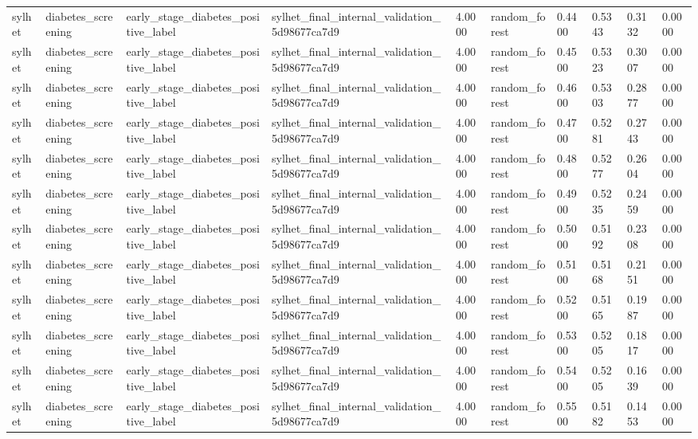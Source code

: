 \begin{tabular}{llllllllll}
sylhet & diabetes\_screening & early\_stage\_diabetes\_positive\_label & sylhet\_final\_internal\_validation\_5d98677ca7d9 & 4.0000 & random\_forest & 0.4400 & 0.5343 & 0.3132 & 0.0000 \\
sylhet & diabetes\_screening & early\_stage\_diabetes\_positive\_label & sylhet\_final\_internal\_validation\_5d98677ca7d9 & 4.0000 & random\_forest & 0.4500 & 0.5323 & 0.3007 & 0.0000 \\
sylhet & diabetes\_screening & early\_stage\_diabetes\_positive\_label & sylhet\_final\_internal\_validation\_5d98677ca7d9 & 4.0000 & random\_forest & 0.4600 & 0.5303 & 0.2877 & 0.0000 \\
sylhet & diabetes\_screening & early\_stage\_diabetes\_positive\_label & sylhet\_final\_internal\_validation\_5d98677ca7d9 & 4.0000 & random\_forest & 0.4700 & 0.5281 & 0.2743 & 0.0000 \\
sylhet & diabetes\_screening & early\_stage\_diabetes\_positive\_label & sylhet\_final\_internal\_validation\_5d98677ca7d9 & 4.0000 & random\_forest & 0.4800 & 0.5277 & 0.2604 & 0.0000 \\
sylhet & diabetes\_screening & early\_stage\_diabetes\_positive\_label & sylhet\_final\_internal\_validation\_5d98677ca7d9 & 4.0000 & random\_forest & 0.4900 & 0.5235 & 0.2459 & 0.0000 \\
sylhet & diabetes\_screening & early\_stage\_diabetes\_positive\_label & sylhet\_final\_internal\_validation\_5d98677ca7d9 & 4.0000 & random\_forest & 0.5000 & 0.5192 & 0.2308 & 0.0000 \\
sylhet & diabetes\_screening & early\_stage\_diabetes\_positive\_label & sylhet\_final\_internal\_validation\_5d98677ca7d9 & 4.0000 & random\_forest & 0.5100 & 0.5168 & 0.2151 & 0.0000 \\
sylhet & diabetes\_screening & early\_stage\_diabetes\_positive\_label & sylhet\_final\_internal\_validation\_5d98677ca7d9 & 4.0000 & random\_forest & 0.5200 & 0.5165 & 0.1987 & 0.0000 \\
sylhet & diabetes\_screening & early\_stage\_diabetes\_positive\_label & sylhet\_final\_internal\_validation\_5d98677ca7d9 & 4.0000 & random\_forest & 0.5300 & 0.5205 & 0.1817 & 0.0000 \\
sylhet & diabetes\_screening & early\_stage\_diabetes\_positive\_label & sylhet\_final\_internal\_validation\_5d98677ca7d9 & 4.0000 & random\_forest & 0.5400 & 0.5205 & 0.1639 & 0.0000 \\
sylhet & diabetes\_screening & early\_stage\_diabetes\_positive\_label & sylhet\_final\_internal\_validation\_5d98677ca7d9 & 4.0000 & random\_forest & 0.5500 & 0.5182 & 0.1453 & 0.0000 \\

\end{tabular}
